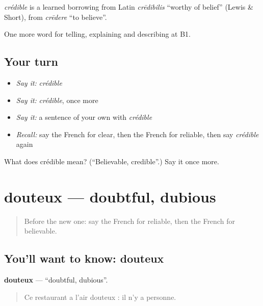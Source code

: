 \begin{cousinweb}
\emph{crédible} is a learned borrowing from Latin \emph{crēdibilis} \textquotedblleft{}worthy of belief\textquotedblright{} (Lewis \& Short), from \emph{crēdere} \textquotedblleft{}to believe\textquotedblright{}.
\end{cousinweb}

\begin{grammarlens}[title={What you've built}]
One more word for telling, explaining and describing at B1.
\end{grammarlens}

\subsection*{Your turn}
\begin{itemize}
\raggedright
  \item \emph{Say it:} \emph{crédible}
  \item \emph{Say it:} \emph{crédible}, once more
  \item \emph{Say it:} a sentence of your own with \emph{crédible}
  \item \emph{Recall:} say the French for clear, then the French for reliable, then say \emph{crédible} again
\end{itemize}

\begin{tcolorbox}[breakable,colback=teal!4,colframe=teal!35!black,title={Before you move on}]
What does crédible mean? (\textquotedblleft{}Believable, credible\textquotedblright{}.) Say it once more.
\end{tcolorbox}
\section[douteux]{douteux — doubtful, dubious}

\label{lesson:FR-C340-douteux}



\begin{quote}
Before the new one: say the French for reliable, then the French for believable.
\end{quote}

\subsection*{You'll want to know: douteux}
\textbf{douteux} — \textquotedblleft{}doubtful, dubious\textquotedblright{}.

\begin{quote}
Ce restaurant a l'air douteux : il n'y a personne.
\end{quote}

